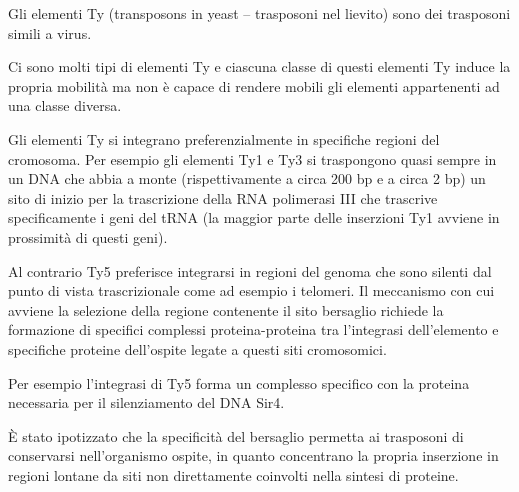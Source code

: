 \documentclass[]{article}
\begin{document}
Gli elementi Ty (transposons in yeast -- trasposoni nel lievito) sono
dei trasposoni simili a virus.

Ci sono molti tipi di elementi Ty e ciascuna classe di questi elementi
Ty induce la propria mobilità ma non è capace di rendere mobili gli
elementi appartenenti ad una classe diversa.

Gli elementi Ty si integrano preferenzialmente in specifiche regioni del
cromosoma. Per esempio gli elementi Ty1 e Ty3 si traspongono quasi
sempre in un DNA che abbia a monte (rispettivamente a circa 200 bp e a
circa 2 bp) un sito di inizio per la trascrizione della RNA polimerasi
III che trascrive specificamente i geni del tRNA (la maggior parte delle
inserzioni Ty1 avviene in prossimità di questi geni).

Al contrario Ty5 preferisce integrarsi in regioni del genoma che sono
silenti dal punto di vista trascrizionale come ad esempio i telomeri. Il
meccanismo con cui avviene la selezione della regione contenente il sito
bersaglio richiede la formazione di specifici complessi
proteina-proteina tra l'integrasi dell'elemento e specifiche proteine
dell'ospite legate a questi siti cromosomici.

Per esempio l'integrasi di Ty5 forma un complesso specifico con la
proteina necessaria per il silenziamento del DNA Sir4.

È stato ipotizzato che la specificità del bersaglio permetta ai
trasposoni di conservarsi nell'organismo ospite, in quanto concentrano
la propria inserzione in regioni lontane da siti non direttamente
coinvolti nella sintesi di proteine.
\end{document}
